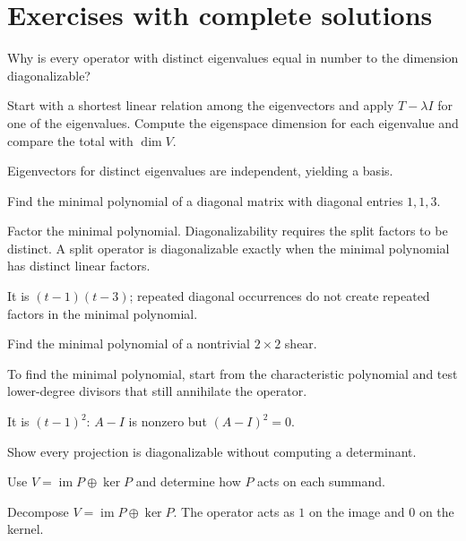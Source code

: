 
\section{Exercises with complete solutions}

\begin{exercise}\label{exr:i11-01}
Why is every operator with distinct eigenvalues equal in number to the dimension diagonalizable?
\end{exercise}
\begin{hint}
Start with a shortest linear relation among the eigenvectors and apply \(T-\lambda I\) for one of the eigenvalues. Compute the eigenspace dimension for each eigenvalue and compare the total with \(\dim V\).
\end{hint}
\begin{solution}
Eigenvectors for distinct eigenvalues are independent, yielding a basis.
\end{solution}

\begin{exercise}\label{exr:i11-02}
Find the minimal polynomial of a diagonal matrix with diagonal entries $1,1,3$.
\end{exercise}
\begin{hint}
Factor the minimal polynomial. Diagonalizability requires the split factors to be distinct. A split operator is diagonalizable exactly when the minimal polynomial has distinct linear factors.
\end{hint}
\begin{solution}
It is $(t-1)(t-3)$; repeated diagonal occurrences do not create repeated factors in the minimal polynomial.
\end{solution}

\begin{exercise}\label{exr:i11-03}
Find the minimal polynomial of a nontrivial $2\times2$ shear.
\end{exercise}
\begin{hint}
To find the minimal polynomial, start from the characteristic polynomial and test lower-degree divisors that still annihilate the operator.
\end{hint}
\begin{solution}
It is $(t-1)^2$: $A-I$ is nonzero but $(A-I)^2=0$.
\end{solution}

\begin{exercise}\label{exr:i11-04}
Show every projection is diagonalizable without computing a determinant.
\end{exercise}
\begin{hint}
Use \(V=\operatorname{im}P\oplus\ker P\) and determine how \(P\) acts on each summand.
\end{hint}
\begin{solution}
Decompose $V=\operatorname{im}P\oplus\ker P$. The operator acts as $1$ on the image and $0$ on the kernel.
\end{solution}

